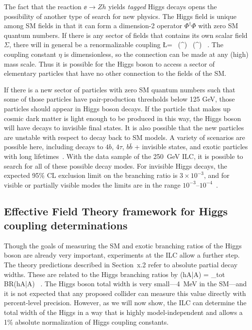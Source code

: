 The fact that the reaction $\ee\to Zh$ yields {\it tagged} Higgs decays opens the 
possibility of another type of search for new physics.
The Higgs field is unique among SM fields in that it can form a dimension-2 operator 
$\Phi^\dagger \Phi$ with zero SM quantum numbers.  If there is any sector of fields that contains its own scalar field $\Sigma$, there will in general be a renormalizable coupling 
\beq
          \Delta \L   =   \eta\    (\Phi^\dagger \Phi) \, (\Sigma^\dagger \Sigma)  \ .
The coupling constant $\eta$ is dimensionless, so the connection can be made at any (high) mass scale.   Thus it is possible for the Higgs boson to access a sector of elementary particles that have no other connection to the fields of the SM. 

If there is a new sector of particles with zero SM quantum numbers such that some of those particles have pair-production thresholds below 125 GeV, those particles should appear in Higgs boson decays.   If the particle that makes up cosmic dark matter is light enough to be produced in this way, the Higgs boson will have decays to invisible final states.   It is also possible that the new particles are unstable with respect to decay back to SM models.   A variety of scenarios are possible here, including decays to $4b$,
$4\tau$, $b\bar b$ + invisible states, and exotic particles with long lifetimes~\cite{Curtin:2013fra}.   With the data sample of the 250~GeV ILC, it is possible to search for all of these possible decay modes.   For  invisible Higgs decays, the expected 95\% CL exclusion limit on the  branching ratio is  $3\times 10^{-3}$, 
and for 
visible or partially visible modes the limits are in the range $10^{-3}$--$10^{-4}$~\cite{Liu:2016zki}. 

\subsection{Effective Field Theory framework for Higgs coupling determinations}
\label{subsec:phys_eft}


Though the goals of measuring the SM and exotic branching ratios of the Higgs boson are already very important, experiments at the ILC allow a further step.   The theory predictions described in Section~x.2 refer to absolute partial decay widths.   These are 
related to the Higgs branching ratios by 
\beq
           \Gamma(h\to A\bar A) =   \Gamma_{tot} \cdot BR(h\to A\bar A)  \  .
\eeqn
The Higgs boson total width is very small---4~MeV in the SM---and it is not expected that any proposed collider can measure this value directly  with percent-level precision.
However, as we will now show, the ILC can determine the total width of the Higgs in a 
way that is highly model-independent and allows a 1\% absolute normalization of Higgs coupling constants.

